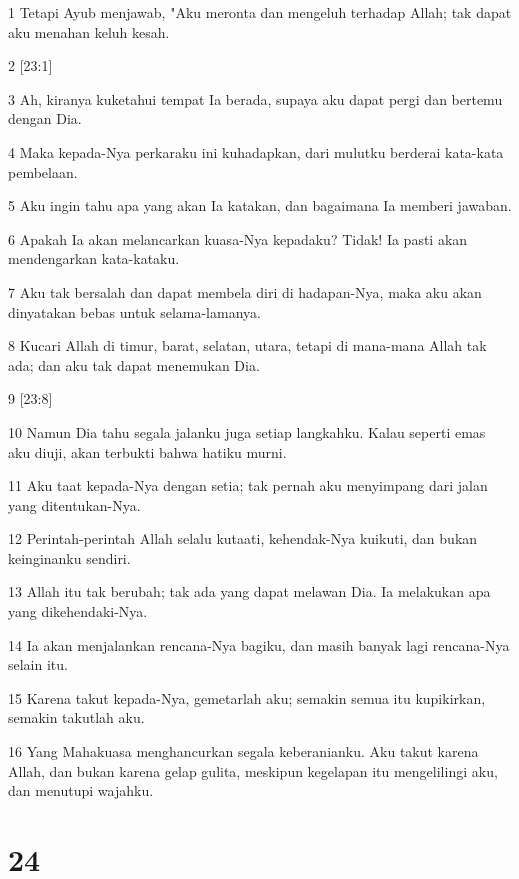 \par 1 Tetapi Ayub menjawab, "Aku meronta dan mengeluh terhadap Allah; tak dapat aku menahan keluh kesah.
\par 2 [23:1]
\par 3 Ah, kiranya kuketahui tempat Ia berada, supaya aku dapat pergi dan bertemu dengan Dia.
\par 4 Maka kepada-Nya perkaraku ini kuhadapkan, dari mulutku berderai kata-kata pembelaan.
\par 5 Aku ingin tahu apa yang akan Ia katakan, dan bagaimana Ia memberi jawaban.
\par 6 Apakah Ia akan melancarkan kuasa-Nya kepadaku? Tidak! Ia pasti akan mendengarkan kata-kataku.
\par 7 Aku tak bersalah dan dapat membela diri di hadapan-Nya, maka aku akan dinyatakan bebas untuk selama-lamanya.
\par 8 Kucari Allah di timur, barat, selatan, utara, tetapi di mana-mana Allah tak ada; dan aku tak dapat menemukan Dia.
\par 9 [23:8]
\par 10 Namun Dia tahu segala jalanku juga setiap langkahku. Kalau seperti emas aku diuji, akan terbukti bahwa hatiku murni.
\par 11 Aku taat kepada-Nya dengan setia; tak pernah aku menyimpang dari jalan yang ditentukan-Nya.
\par 12 Perintah-perintah Allah selalu kutaati, kehendak-Nya kuikuti, dan bukan keinginanku sendiri.
\par 13 Allah itu tak berubah; tak ada yang dapat melawan Dia. Ia melakukan apa yang dikehendaki-Nya.
\par 14 Ia akan menjalankan rencana-Nya bagiku, dan masih banyak lagi rencana-Nya selain itu.
\par 15 Karena takut kepada-Nya, gemetarlah aku; semakin semua itu kupikirkan, semakin takutlah aku.
\par 16 Yang Mahakuasa menghancurkan segala keberanianku. Aku takut karena Allah, dan bukan karena gelap gulita, meskipun kegelapan itu mengelilingi aku, dan menutupi wajahku.

\chapter{24}

